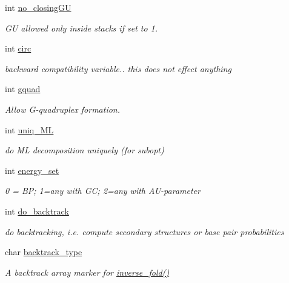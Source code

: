 \begin{DoxyCompactItemize}
int \mbox{\hyperlink{group__model__details_gaa8d1c7b92489179e1eafa562b7bdd259}{no\+\_\+closing\+GU}}
\begin{DoxyCompactList}\small\item\em GU allowed only inside stacks if set to 1. \end{DoxyCompactList}\item 
int \mbox{\hyperlink{group__model__details_gaf9202a1a09f5828dc731e2d9a10fa111}{circ}}
\begin{DoxyCompactList}\small\item\em backward compatibility variable.. this does not effect anything \end{DoxyCompactList}\item 
int \mbox{\hyperlink{group__model__details_ga25f2bdcdf56e813d288845484a13d704}{gquad}}
\begin{DoxyCompactList}\small\item\em Allow G-\/quadruplex formation. \end{DoxyCompactList}\item 
int \mbox{\hyperlink{group__model__details_ga6c5655c8b272e3e6cab74dd0f540294f}{uniq\+\_\+\+ML}}
\begin{DoxyCompactList}\small\item\em do ML decomposition uniquely (for subopt) \end{DoxyCompactList}\item 
int \mbox{\hyperlink{group__model__details_gafb1ef1166da85092ae8a325e02dcae71}{energy\+\_\+set}}
\begin{DoxyCompactList}\small\item\em 0 = BP; 1=any with GC; 2=any with A\+U-\/parameter \end{DoxyCompactList}\item 
int \mbox{\hyperlink{group__model__details_gad512b5dd4dbec60faccfe137bb474489}{do\+\_\+backtrack}}
\begin{DoxyCompactList}\small\item\em do backtracking, i.\+e. compute secondary structures or base pair probabilities \end{DoxyCompactList}\item 
char \mbox{\hyperlink{group__model__details_ga83bdb43472a259c71e69fa9f70f420c3}{backtrack\+\_\+type}}
\begin{DoxyCompactList}\small\item\em A backtrack array marker for \mbox{\hyperlink{group__inverse__fold_ga7af026de55d4babad879f2c92559cbbc}{inverse\+\_\+fold()}} \end{DoxyCompactList}\item 

\end{DoxyCompactItemize}
